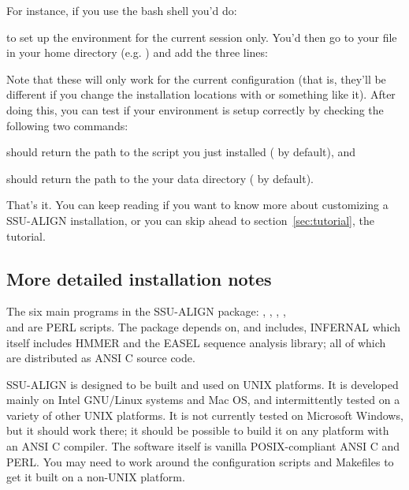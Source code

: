 For instance, if you use the bash shell you'd do:


to set up the environment for the current session only. You'd then go
to your  file in your home directory (e.g.
) and add the three lines: 




Note that these will only work for the current configuration (that is,
they'll be different if you change the installation locations with
 or something like it). After doing this, you can test
if your environment is setup correctly by checking the following two
commands: 



should return the path to the  script you
just installed ( by default), and


should return the path to the your data directory
( by default).

That's it. You can keep reading if you want to know more about
customizing a SSU-ALIGN installation, or you can skip ahead to
section~\ref{sec:tutorial}, the tutorial.

\subsection{More detailed installation notes}

The six main programs in the SSU-ALIGN package:
, , , ,\\
 and  are PERL scripts. The
package depends on, and includes, INFERNAL 
which itself includes HMMER and the EASEL sequence analysis
library; all of which are distributed as ANSI C source code. 

SSU-ALIGN is designed to be built and used on UNIX platforms. It
is developed mainly on Intel GNU/Linux systems and Mac OS, and
intermittently tested on a variety of other UNIX platforms. It is not
currently tested on Microsoft Windows, but it should work there; it
should be possible to build it on any platform with an ANSI C
compiler. The software itself is vanilla POSIX-compliant ANSI C and
PERL. You may need to work around the configuration scripts and
Makefiles to get it built on a non-UNIX platform.

